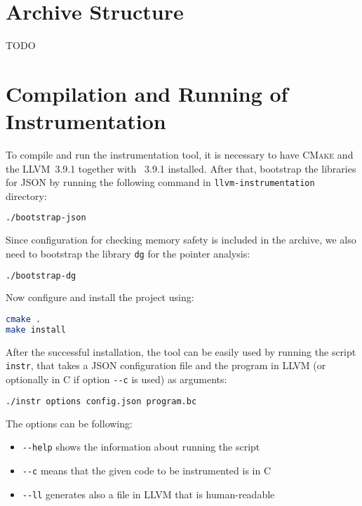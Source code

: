 
\section{Archive Structure}

TODO

\section{Compilation and Running of Instrumentation}

To compile and run the instrumentation tool, it is necessary to have
\textsc{CMake} and the LLVM~3.9.1 together with \clang~3.9.1 installed. After
that, bootstrap the libraries for JSON by running the following command in
\texttt{llvm-instrumentation} directory:

\begin{lstlisting}[language=bash]
./bootstrap-json
\end{lstlisting}

\noindent Since configuration for checking memory safety is included in the archive, we
also need to bootstrap the library \texttt{dg} for the pointer analysis:

\begin{lstlisting}[language=bash]
./bootstrap-dg
\end{lstlisting}

\noindent Now configure and install the project using:

\begin{lstlisting}[language=bash]
cmake .
make install
\end{lstlisting}

\noindent After the successful installation, the tool can be easily used by running the script
\texttt{instr}, that takes a JSON configuration file and the program in LLVM (or optionally in C if option \texttt{-{}-c} is used) as arguments:

\begin{lstlisting}[language=bash]
./instr options config.json program.bc
\end{lstlisting}

\noindent The options can be following:
\begin{itemize}
  \item \texttt{-{}-help} shows the information about running the script
  \item \texttt{-{}-c} means that the given code to be instrumented is in C
  \item \texttt{-{}-ll} generates also a file in LLVM that is human-readable
\end{itemize}

